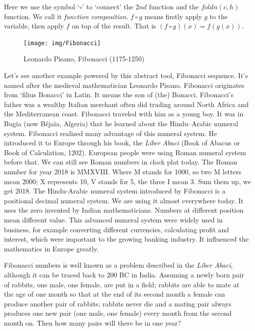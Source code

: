 \documentclass[b5paper]{article}
\begin{document}
Here we use the symbol `$\circ$' to `connect' the $2nd$ function and the $foldn(c, h)$ function. We call it {\em function composition}. $f\circ g$ means firstly apply $g$ to the variable, then apply $f$ on top of the result. That is $(f\circ g)(x) = f(g(x))$.

\begin{figure}[htbp]
 \centering
 \texttt{[image: img/Fibonacci]}
 \caption{Leonardo Pisano, Fibonacci (1175-1250)}
 \label{fig:Fibonacci}
\end{figure}

Let's see another example powered by this abstract tool, Fibonacci sequence. It's named after the medieval mathematician Leonardo Pisano. Fibonacci originates from `filius Bonacci' in Latin. It means the son of (the) Bonacci. Fibonacci's father was a wealthy Italian merchant
 often did trading around North Africa and the Mediterranean coast. Fibonacci traveled with him as a young boy. It was in Bugia (now Béjaïa, Algeria) that he learned about the Hindu–Arabic numeral system. Fibonacci realized many advantage of this numeral system. He introduced it to Europe through his book, the {\em Liber Abaci} (Book of Abacus or Book of Calculation, 1202). European people were using Roman numeral system before that. We can still see Roman numbers in clock plat today. The Roman number for year 2018 is MMXVIII. Where M stands for 1000, so two M letters mean 2000; X represents 10, V stands for 5, the three I mean 3. Sum them up, we get 2018. The Hindu-Arabic numeral system introduced by Fibonacci is a positional decimal numeral system. We are using it almost everywhere today. It uses the zero invented by Indian mathematicians. Numbers at different position mean different value. This advanced numeral system were widely used in business, for example converting different currencies, calculating profit and interest, which were important to the growing banking industry. It influenced the mathematics in Europe greatly.

Fibonacci numbers is well known as a problem described in the {\em Liber Abaci}, although it can be traced back to 200 BC in India. Assuming a newly born pair of rabbits, one male, one female, are put in a field; rabbits are able to mate at the age of one month so that at the end of its second month a female can produce another pair of rabbits; rabbits never die and a mating pair always produces one new pair (one male, one female) every month from the second month on. Then how many pairs will there be in one year?
\end{document}
